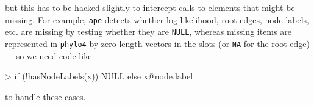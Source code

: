 \documentclass{article}
\newcommand{\code}[1]{{{\tt #1}}}
\begin{document}
\begin{Schunk}
\end{Schunk}

but this has to be hacked slightly to intercept calls to elements that might be missing.  For example, \code{ape} detects whether log-likelihood, root edges, node labels, etc. are missing by testing whether they are \code{NULL}, whereas missing items are represented in \code{phylo4} by zero-length vectors in the slots (or \code{NA} for the root edge) --- so we need code like 
\begin{Schunk}
\begin{Sinput}
> if (!hasNodeLabels(x)) NULL else x@node.label
\end{Sinput}
\end{Schunk}
to handle these cases.
\end{document}
